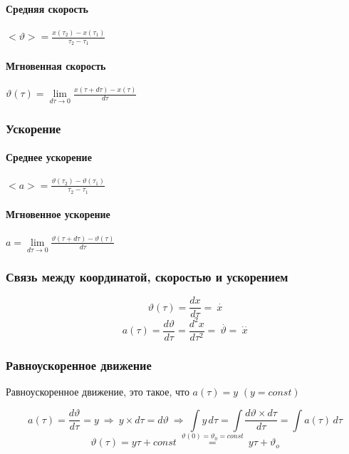 \documentclass[class=article,a4paper,12pt,crop=false]{standalone}
\begin{document}
  \paragraph{Средняя скорость} $<\vartheta > = \frac{x(\tau_2) - x(\tau_1)}{\tau_2 - \tau_1}$

  \paragraph{Мгновенная скорость} $\vartheta(\tau) = \lim\limits_{d\tau \rightarrow 0}\frac{x(\tau + d\tau) - x(\tau)}{d\tau}$

  \subsubsection{Ускорение}

  \paragraph{Среднее ускорение} $<a> = \frac{\vartheta(\tau_2) - \vartheta(\tau_1)}{\tau_2 - \tau_1}$

  \paragraph{Мгновенное ускорение} $a = \lim\limits_{d\tau \rightarrow 0}\frac{\vartheta(\tau + d\tau) - \vartheta(\tau)}{d\tau}$

  \subsubsection{Связь между координатой, скоростью и ускорением}

  \begin{equation}
    \vartheta (\tau) = \frac{dx}{d\tau} = \: \stackrel{\cdot }{x}
  \end{equation}
  \begin{equation}
    a(\tau) = \frac{d\vartheta}{d\tau} = \frac{d^2x}{d\tau^2} = \: \stackrel{\cdot}{\vartheta} = \: \stackrel{\cdot\cdot}{x}
  \end{equation}

  \subsubsection{Равноускоренное движение}

  Равноускоренное движение, это такое, что $a(\tau) = y $ $(y= const)$

  \begin{equation}
    a(\tau) = \frac{d\vartheta}{d\tau} = y \: \Rightarrow \:
    y \times d\tau = d\vartheta \: \Rightarrow \:
    \int y \,d\tau = \int \frac{d\vartheta \times d\tau}{d\tau} = \int a(\tau)\, d\tau
  \end{equation}
  \begin{equation}
    \vartheta(\tau) = y\tau + const \: \stackrel{\vartheta(0) = \vartheta_0 = const}{=} \: y\tau + \vartheta_o
  \end{equation}
\end{document}
